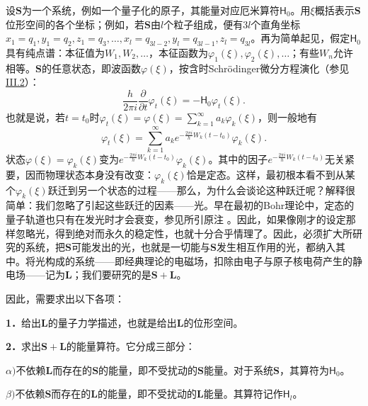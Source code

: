 \documentclass[fontsize=13pt,twoside,openany,headings=normal,parskip=false,bookmarkpackage=false,DIV=calc]{scrbook}
\begin{document}
设$\boldsymbol{S}$为一个系统，例如一个量子化的原子，其能量对应厄米算符$\mathsf{H}_0$。用$\xi$概括表示$\boldsymbol{S}$位形空间的各个坐标；例如，若$\boldsymbol{S}$由$l$个粒子组成，便有$3l$个直角坐标$x_1=q_1,\allowbreak y_1=q_2,\allowbreak z_1=q_3,\allowbreak \ldots,\allowbreak x_l=q_{3l-2},\allowbreak y_l=q_{3l-1},\allowbreak z_l=q_{3l}$。再为简单起见，假定$\mathsf{H}_0$具有纯点谱：本征值为$W_1,\allowbreak W_2,\allowbreak \ldots$，本征函数为$\varphi_1(\xi),\allowbreak \varphi_2(\xi),\allowbreak \ldots$；有些$W_n$允许相等。$\boldsymbol{S}$的任意状态，即波函数$\varphi(\xi)$，按含时Schrödinger微分方程演化（参见 \hyperref[sec:III.2]{III.2}）：
\[
 \frac{h}{2\pi i}\frac{\partial}{\partial t}\varphi_t(\xi)=-\mathsf{H}_0\varphi_t(\xi).
\]
也就是说，若$t=t_0$时$\varphi_t(\xi)=\varphi(\xi)=\sum_{k=1}^{\infty}a_k\varphi_k(\xi)$，则一般地有
\[
 \varphi_t(\xi)=\sum_{k=1}^{\infty}a_ke^{-\frac{2\pi i}{h}W_k(t-t_0)}\varphi_k(\xi).
\]
状态$\varphi(\xi)=\varphi_k(\xi)$变为$e^{-\frac{2\pi i}{h}W_k(t-t_0)}\varphi_k(\xi)$。其中的因子$e^{-\frac{2\pi i}{h}W_k(t-t_0)}$无关紧要，因而物理状态本身没有改变：$\varphi_k(\xi)$恰是定态。这样，最初根本看不到从某个$\varphi_k(\xi)$跃迁到另一个状态的过程——那么，为什么会谈论这种跃迁呢？解释很简单：我们忽略了引起这些跃迁的因素——光。早在最初的Bohr理论中，定态的量子轨道也只有在发光时才会衰变，参见所引原注 \hyperlink{note-5}{}。因此，如果像刚才的设定那样忽略光，得到绝对而永久的稳定性，\hypertarget{origpage-136}{}\label{origpage-136}也就十分合乎情理了。因此，必须扩大所研究的系统，把$\boldsymbol{S}$可能发出的光，也就是一切能与$\boldsymbol{S}$发生相互作用的光，都纳入其中。将光构成的系统——即经典理论的电磁场，扣除由电子与原子核电荷产生的静电场——记为$\boldsymbol{L}$；我们要研究的是$\boldsymbol{S}+\boldsymbol{L}$。

因此，需要求出以下各项：

\leavevmode{}\label{problem:III.6.1}\textbf{1．}给出$\boldsymbol{L}$的量子力学描述，也就是给出$\boldsymbol{L}$的位形空间。

\leavevmode{}\label{problem:III.6.2}\textbf{2．}求出$\boldsymbol{S}+\boldsymbol{L}$的能量算符。它分成三部分：

\leavevmode{}\label{problem:III.6.2alpha}\textbf{$\alpha)$}不依赖$\boldsymbol{L}$而存在的$\boldsymbol{S}$的能量，即不受扰动的$\boldsymbol{S}$能量。对于系统$\boldsymbol{S}$，其算符为$\mathsf{H}_0$。

\leavevmode{}\label{problem:III.6.2beta}\textbf{$\beta)$}不依赖$\boldsymbol{S}$而存在的$\boldsymbol{L}$的能量，即不受扰动的$\boldsymbol{L}$能量。其算符记作$\mathsf{H}_l$。
\end{document}
